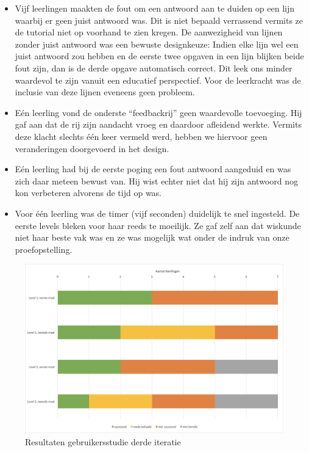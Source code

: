 \documentclass[11pt]{article}
\begin{document}
\begin{itemize}
\item Vijf leerlingen maakten de fout om een antwoord aan te duiden op een lijn waarbij er geen juist antwoord was. Dit is niet bepaald verrassend vermits ze de tutorial niet op voorhand te zien kregen. De aanwezigheid van lijnen zonder juist antwoord was een bewuste designkeuze: Indien elke lijn wel een juist antwoord zou hebben en de eerste twee opgaven in een lijn blijken beide fout zijn, dan is de derde opgave automatisch correct. Dit leek ons minder waardevol te zijn vanuit een educatief perspectief. Voor de leerkracht was de inclusie van deze lijnen eveneens geen probleem.
\item E\'en leerling vond de onderste ``feedbackrij'' geen waardevolle toevoeging. Hij gaf aan dat de rij zijn aandacht vroeg en daardoor afleidend werkte. Vermits deze klacht slechts \'e\'en keer vermeld werd, hebben we hiervoor geen veranderingen doorgevoerd in het design.
\item E\'en leerling had bij de eerste poging een fout antwoord aangeduid en was zich daar meteen bewust van. Hij wist echter niet dat hij zijn antwoord nog kon verbeteren alvorens de tijd op was.
\item Voor \'e\'en leerling was de timer (vijf seconden) duidelijk te snel ingesteld. De eerste levels bleken voor haar reeds te moeilijk. Ze gaf zelf aan dat wiskunde niet haar beste vak was en ze was mogelijk wat onder de indruk van onze proefopstelling.
\end{itemize}

    \begin{figure}
    	\includegraphics[width=\textwidth]{pictures/derde_iteratie.png}
        \caption{Resultaten gebruikersstudie derde iteratie}
        \label{figuur1}
   	\end{figure}
    
\end{document}
